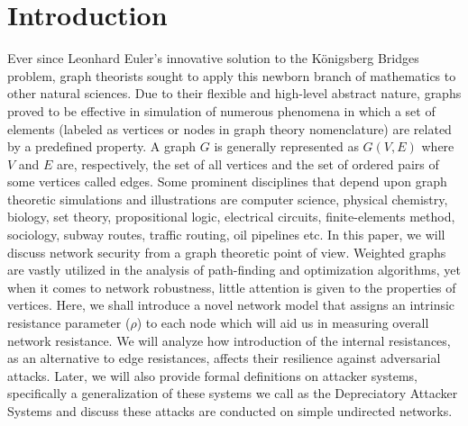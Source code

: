 \documentclass{article}
\begin{document}
	\section{Introduction}
	Ever since Leonhard Euler's innovative solution to the K\"{o}nigsberg Bridges problem, graph theorists sought to apply this newborn branch of mathematics to other natural sciences. Due to their flexible and high-level abstract nature, graphs proved to be effective in simulation of numerous phenomena in which a set of elements (labeled as vertices or nodes in graph theory nomenclature) are related by a predefined property\cite{tucker2012applied}. A graph $G$ is generally represented as $G(V,E)$ where $V$ and $E$ are, respectively, the set of all vertices and the set of ordered pairs of some vertices called edges. Some prominent disciplines that depend upon graph theoretic simulations and illustrations are computer science, physical chemistry\cite{klein1993m}, biology\cite{mason2007graph}, set theory, propositional logic, electrical circuits, finite-elements method, sociology, subway routes, traffic routing, oil pipelines etc. In this paper, we will discuss network security from a graph theoretic point of view. Weighted graphs are vastly utilized in the analysis of path-finding and optimization algorithms, yet when it comes to network robustness, little attention is given to the properties of vertices. Here, we shall introduce a novel network model that assigns an intrinsic resistance parameter ($\rho$) to each node which will aid us in measuring overall network resistance. We will analyze how introduction of the internal resistances, as an alternative to edge resistances, affects their resilience against adversarial attacks. Later, we will also provide formal definitions on attacker systems, specifically a generalization of these systems we call as the Depreciatory Attacker Systems and discuss these attacks are conducted on simple undirected networks.
	
	
\end{document}
